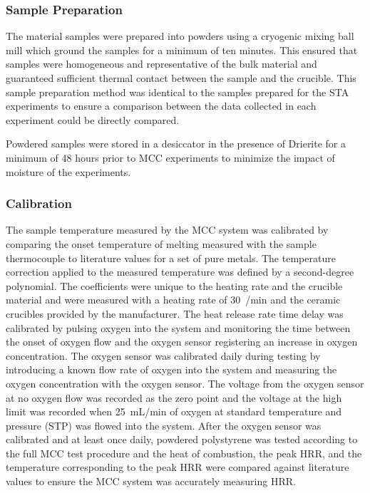 \documentclass[12pt,oneside]{book}
\begin{document}
\subsubsection{Sample Preparation}

The material samples were prepared into powders using a cryogenic mixing ball mill which ground the samples for a minimum of ten minutes. This ensured that samples were homogeneous and representative of the bulk material and guaranteed sufficient thermal contact between the sample and the crucible. This sample preparation method was identical to the samples prepared for the STA experiments to ensure a comparison between the data collected in each experiment could be directly compared.

Powdered samples were stored in a desiccator in the presence of Drierite for a minimum of 48 hours prior to MCC experiments to minimize the impact of moisture of the experiments.

\subsubsection{Calibration}

The sample temperature measured by the MCC system was calibrated by comparing the onset temperature of melting measured with the sample thermocouple to literature values for a set of pure metals. The temperature correction applied to the measured temperature was defined by a second-degree polynomial. The coefficients were unique to the heating rate and the crucible material and were measured with a heating rate of 30~\degC{}/min and the ceramic crucibles provided by the manufacturer. The heat release rate time delay was calibrated by pulsing oxygen into the system and monitoring the time between the onset of oxygen flow and the oxygen sensor registering an increase in oxygen concentration. The oxygen sensor was calibrated daily during testing by introducing a known flow rate of oxygen into the system and measuring the oxygen concentration with the oxygen sensor. The voltage from the oxygen sensor at no oxygen flow was recorded as the zero point and the voltage at the high limit was recorded when 25~mL/min of oxygen at standard temperature and pressure (STP) was flowed into the system. After the oxygen sensor was calibrated and at least once daily, powdered polystyrene was tested according to the full MCC test procedure and the heat of combustion, the peak HRR, and the temperature corresponding to the peak HRR were compared against literature values to ensure the MCC system was accurately measuring HRR.
\end{document}
